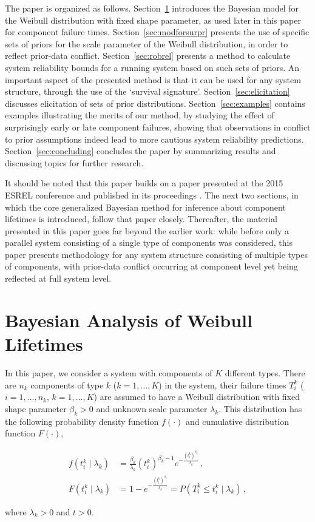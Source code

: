 \documentclass[Journal,letterpaper]{ascelike-new}
\begin{document}
The paper is organized as follows. Section~\ref{sec:weibull} introduces the Bayesian model for the Weibull 
distribution with fixed shape parameter, as used later in this paper for component failure times.
Section~\ref{sec:modforsurpr} presents the use of specific sets of priors
for the scale parameter of the Weibull distribution, in order to reflect prior-data conflict.
Section~\ref{sec:robrel} presents a method to calculate system reliability bounds
for a running system based on such sets of priors. An important aspect of the presented method
is that it can be used for any system structure, through the use of the `survival signature'. 
Section~\ref{sec:elicitation} discusses elicitation of sets of prior distributions.
Section~\ref{sec:examples} contains examples illustrating the merits of our method,
by studying the effect of surprisingly early or late component failures,
showing that observations in conflict to prior assumptions
indeed lead to more cautious system reliability predictions.
Section~\ref{sec:concluding} concludes the paper by summarizing results
and discussing topics for further research.

It should be noted that this paper builds on
a paper presented at the 2015 ESREL conference and published in its proceedings \cite{2015:walter}. 
The next two sections, in which the core generalized Bayesian method for inference about component lifetimes is
introduced, follow that paper closely. Thereafter, the material presented in this paper goes far beyond
the earlier work: while before only a parallel system consisting of a single type of components was
considered, this paper presents methodology for any system structure consisting of multiple types of
components, with prior-data conflict occurring at component level yet being reflected at full system level.




\section{Bayesian Analysis of Weibull Lifetimes}
\label{sec:weibull}

In this paper, we consider a system with components of $K$ different types.
There are $n_k$ components of type $k$ ($k=1,\ldots,K$) in the system, their
failure times $T_i^k$ ($i=1,\ldots,n_k$, $k = 1, \ldots, K$) are assumed to have
a Weibull distribution with fixed shape parameter $\beta_k > 0$ and unknown scale
parameter $\lambda_k$. This distribution has the following probability density function
$f(\cdot)$ and cumulative distribution function $F(\cdot)$,
\begin{linenomath*}
\begin{align}
\label{eq:weibulldens}
f(t_i^k \mid \lambda_k) &= \frac{\beta_k}{\lambda_k} (t_i^k)^{\beta_k-1} e^{-\frac{(t_i^k)^{\beta_k}}{\lambda_k}}\,, \\
\label{eq:weibullcdf}
F(t_i^k \mid \lambda_k) &= 1 - e^{-\frac{(t_i^k)^{\beta_k}}{\lambda_k}} = P(T_i^k \leq t_i^k \mid \lambda_k)\,,
\end{align}
\end{linenomath*}
where $\lambda_k > 0$ and $t > 0$.
\end{document}
